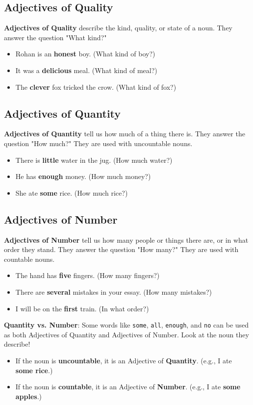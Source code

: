 \subsection*{Adjectives of Quality}
\textbf{Adjectives of Quality} describe the kind, quality, or state of a noun. They answer the question "What kind?"
\begin{itemize}
    \item Rohan is an \textbf{honest} boy. (What kind of boy?)
    \item It was a \textbf{delicious} meal. (What kind of meal?)
    \item The \textbf{clever} fox tricked the crow. (What kind of fox?)
\end{itemize}

\subsection*{Adjectives of Quantity}
\textbf{Adjectives of Quantity} tell us how much of a thing there is. They answer the question "How much?" They are used with uncountable nouns.
\begin{itemize}
    \item There is \textbf{little} water in the jug. (How much water?)
    \item He has \textbf{enough} money. (How much money?)
    \item She ate \textbf{some} rice. (How much rice?)
\end{itemize}

\subsection*{Adjectives of Number}
\textbf{Adjectives of Number} tell us how many people or things there are, or in what order they stand. They answer the question "How many?" They are used with countable nouns.
\begin{itemize}
    \item The hand has \textbf{five} fingers. (How many fingers?)
    \item There are \textbf{several} mistakes in your essay. (How many mistakes?)
    \item I will be on the \textbf{first} train. (In what order?)
\end{itemize}

\begin{warningbox}
    \textbf{Quantity vs. Number}: Some words like \texttt{some}, \texttt{all}, \texttt{enough}, and \texttt{no} can be used as both Adjectives of Quantity and Adjectives of Number. Look at the noun they describe!
    \begin{itemize}
        \item If the noun is \textbf{uncountable}, it is an Adjective of \textbf{Quantity}. (e.g., I ate \textbf{some rice}.)
        \item If the noun is \textbf{countable}, it is an Adjective of \textbf{Number}. (e.g., I ate \textbf{some apples}.)
    \end{itemize}
\end{warningbox}

